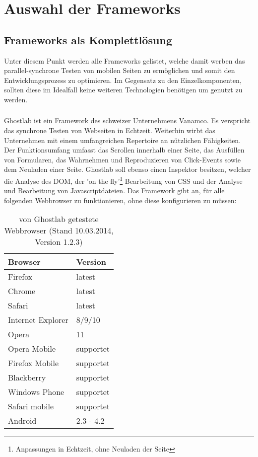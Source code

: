\chapter{Auswahl der \Gls{Framework}s}

\section{\Gls{Framework}s als Komplettlösung}
Unter diesem Punkt werden alle \Gls{Framework}s gelistet, welche damit werben das \Gls{parallel-synchron}e Testen von mobilen Seiten zu ermöglichen und somit den Entwicklungsprozess zu optimieren. Im Gegensatz zu den Einzelkomponenten, sollten diese im Idealfall keine weiteren Technologien benötigen um genutzt zu werden.
	
	\subsection{}
	Ghostlab ist ein \Gls{Framework} des schweizer Unternehmens Vanamco. Es verspricht das synchrone Testen von Webseiten in Echtzeit. Weiterhin wirbt das Unternehmen mit einem umfangreichen Repertoire an nützlichen Fähigkeiten. Der Funktionsumfang umfasst das Scrollen innerhalb einer Seite, das Ausfüllen von  Formularen, das Wahrnehmen und Reproduzieren von Click-Events sowie dem Neuladen einer Seite. Ghostlab soll ebenso einen Inspektor besitzen, welcher die Analyse des \Gls{DOM}, der 'on the fly'\footnote{Anpassungen in Echtzeit, ohne Neuladen der Seite} Bearbeitung von CSS und der Analyse und Bearbeitung von \Gls{Javascript}dateien. Das \Gls{Framework} gibt an, für alle folgenden \Gls{Webbrowser} zu funktionieren, ohne diese konfigurieren zu müssen:

	\begin{table}[H]
 		\centering
			\begin{tabular}{| p{5cm} | p{5cm} |}
			
			\hline
				Browser 	& 	Version\\
			\hline
			\hline
				Firefox	&	latest\\
				Chrome	&	latest\\
				Safari	&	latest\\
				Internet Explorer	&	8/9/10\\
				Opera	&	11\\
				Opera Mobile	&	supportet\\
				Firefox Mobile	&	supportet\\
				Blackberry	&	supportet\\
				Windows Phone	&	supportet\\
				Safari mobile	&	supportet\\	
				Android	&	2.3 - 4.2\\
				\hline
				\end{tabular}
			\caption{von Ghostlab getestete \Gls{Webbrowser} (Stand 10.03.2014, Version 1.2.3)}
	\end{table}

